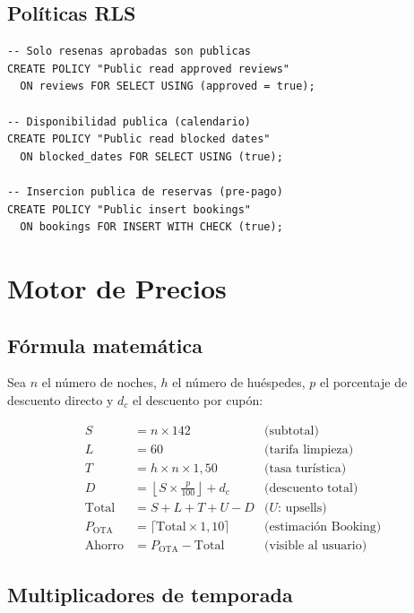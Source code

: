 \documentclass[12pt,a4paper,twoside,openright]{report}
\begin{document}
\section{Políticas RLS}

\begin{lstlisting}[style=sqlStyle]
-- Solo resenas aprobadas son publicas
CREATE POLICY "Public read approved reviews"
  ON reviews FOR SELECT USING (approved = true);

-- Disponibilidad publica (calendario)
CREATE POLICY "Public read blocked dates"
  ON blocked_dates FOR SELECT USING (true);

-- Insercion publica de reservas (pre-pago)
CREATE POLICY "Public insert bookings"
  ON bookings FOR INSERT WITH CHECK (true);
\end{lstlisting}

\chapter{Motor de Precios}

\section{Fórmula matemática}

Sea $n$ el número de noches, $h$ el número de huéspedes, $p$ el porcentaje de
descuento directo y $d_c$ el descuento por cupón:

\begin{align}
  S &= n \times 142                     & \text{(subtotal)} \\
  L &= 60                                & \text{(tarifa limpieza)} \\
  T &= h \times n \times 1{,}50          & \text{(tasa turística)} \\
  D &= \left\lfloor S \times \frac{p}{100} \right\rfloor + d_c & \text{(descuento total)} \\
  \text{Total} &= S + L + T + U - D      & \text{($U$: upsells)} \\
  P_{\text{OTA}} &= \lceil \text{Total} \times 1{,}10 \rceil & \text{(estimación Booking)} \\
  \text{Ahorro} &= P_{\text{OTA}} - \text{Total}               & \text{(visible al usuario)}
\end{align}

\section{Multiplicadores de temporada}
\end{document}
